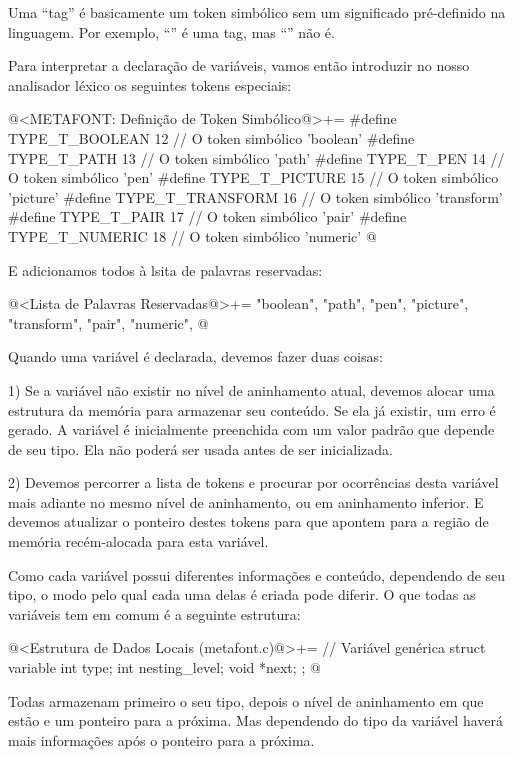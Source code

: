 Uma ``tag'' é basicamente um token simbólico sem um significado
pré-definido na linguagem. Por exemplo, ``'' é uma tag,
mas ``'' não é.

Para interpretar a declaração de variáveis, vamos então introduzir no
nosso analisador léxico os seguintes tokens especiais:

\iniciocodigo
@<METAFONT: Definição de Token Simbólico@>+=
#define TYPE_T_BOOLEAN               12 // O token simbólico 'boolean'
#define TYPE_T_PATH                  13 // O token simbólico 'path'
#define TYPE_T_PEN                   14 // O token simbólico 'pen'
#define TYPE_T_PICTURE               15 // O token simbólico 'picture'
#define TYPE_T_TRANSFORM             16 // O token simbólico 'transform'
#define TYPE_T_PAIR                  17 // O token simbólico 'pair'
#define TYPE_T_NUMERIC               18 // O token simbólico 'numeric'
@
\fimcodigo

E adicionamos todos à lsita de palavras reservadas:

\iniciocodigo
@<Lista de Palavras Reservadas@>+=
"boolean", "path", "pen", "picture", "transform", "pair", "numeric",
@
\fimcodigo


Quando uma variável é declarada, devemos fazer duas coisas:

1) Se a variável não existir no nível de aninhamento atual, devemos
alocar uma estrutura da memória para armazenar seu conteúdo. Se ela já
existir, um erro é gerado. A variável é inicialmente preenchida com um
valor padrão que depende de seu tipo. Ela não poderá ser usada antes
de ser inicializada.

2) Devemos percorrer a lista de tokens e procurar por ocorrências
desta variável mais adiante no mesmo nível de aninhamento, ou em
aninhamento inferior. E devemos atualizar o ponteiro destes tokens
para que apontem para a região de memória recém-alocada para esta
variável.

Como cada variável possui diferentes informações e conteúdo,
dependendo de seu tipo, o modo pelo qual cada uma delas é criada pode
diferir. O que todas as variáveis tem em comum é a seguinte estrutura:

\iniciocodigo
@<Estrutura de Dados Locais (metafont.c)@>+=
// Variável genérica
struct variable{
  int type;
  int nesting_level;
  void *next;
};
@
\fimcodigo

Todas armazenam primeiro o seu tipo, depois o nível de aninhamento em
que estão e um ponteiro para a próxima. Mas dependendo do tipo da
variável haverá mais informações após o ponteiro para a próxima.

